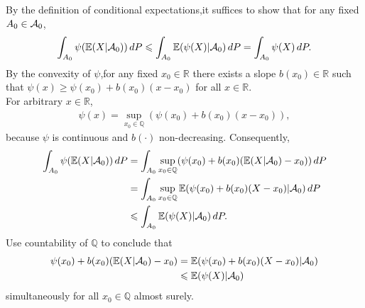 \documentclass{report}
\begin{document}
{\begin{myproof}
\end{myproof}
\begin{myproof}
    By the definition of conditional expectations,it suffices to show that for any fixed $A_0\in\mathcal A_0$,
    \begin{align*}
        \int_{A_0}\psi(\mathbb{E}(X|\mathcal A_0))\,dP\leqslant\int_{A_0}\mathbb{E}(\psi(X)|\mathcal A_0)\,dP=\int_{A_0}\psi(X)\,dP.
    \end{align*}
    By the convexity of $\psi$,for any fixed $x_0\in\mathbb{R}$ there exists a slope $b(x_0)\in\mathbb{R}$ such that $\psi(x)\geq\psi(x_0)+b(x_0)(x-x_0)$ for all $x\in\mathbb{R}$.\\
    For arbitrary $x\in\mathbb{R}$,
    \begin{align*}
        \psi(x)=\sup_{x_0\in\mathbb{Q}}(\psi(x_0)+b(x_0)(x-x_0)),
    \end{align*}because $\psi$ is continuous and $b(\cdot)$ non-decreasing. Consequently,
    \begin{align*}
        \int_{A_0}\psi(\mathbb{E}(X|\mathcal A_0))\,dP&=\int_{A_0}\sup_{x_0\in\mathbb{Q}}(\psi(x_0)+b(x_0)(\mathbb{E}(X|\mathcal A_0)-x_0))\,dP\\
        &=\int_{A_0}\sup_{x_0\in\mathbb{Q}}\mathbb{E}(\psi(x_0)+b(x_0)(X-x_0)|\mathcal A_0)\,dP\\
        &\leqslant\int_{A_0}\mathbb{E}(\psi(X)|\mathcal A_0)\,dP.
    \end{align*}Use countability of $\mathbb{Q}$ to conclude that
    \begin{align*}
        \psi(x_0)+b(x_0)(\mathbb{E}(X|\mathcal A_0)-x_0)&=\mathbb{E}(\psi(x_0)+b(x_0)(X-x_0)|\mathcal A_0)\\
        &\leqslant \mathbb{E}(\psi(X)|\mathcal A_0)
    \end{align*}simultaneously for all $x_0\in\mathbb{Q}$ almost surely.
\end{myproof}
}
\end{document}
